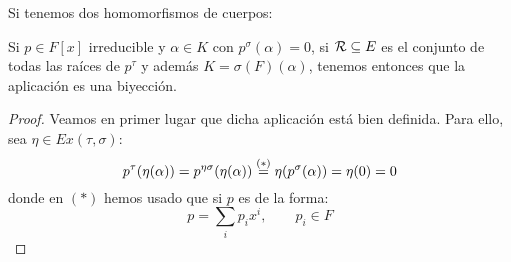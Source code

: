 \begin{prop}
    Si tenemos dos homomorfismos de cuerpos:
    \begin{figure}[H]
        \centering
    \end{figure}
    \noindent
    Si $p\in F[x]$ irreducible y $\alpha\in K$ con $p^{\sigma}(\alpha)=0$, si $\mathcal{R}\subseteq E$ es el conjunto de todas las raíces de $p^\tau$ y además $K = \sigma(F)(\alpha)$, tenemos entonces que la aplicación
    es una biyección.
    \begin{proof}
        Veamos en primer lugar que dicha aplicación está bien definida. Para ello, sea $\eta \in Ex(\tau, \sigma)$:
        \begin{equation*}
            p^\tau(\eta(\alpha)) = p^{\eta \sigma}(\eta (\alpha)) \stackrel{(\ast)}{=} \eta(p^\sigma(\alpha)) = \eta(0) = 0
        \end{equation*}
        donde en $(\ast)$ hemos usado que si $p$ es de la forma:
        \begin{equation*}
            p = \sum_i p_i x^i, \qquad p_i \in F
        \end{equation*}


\end{proof}
\end{prop}
